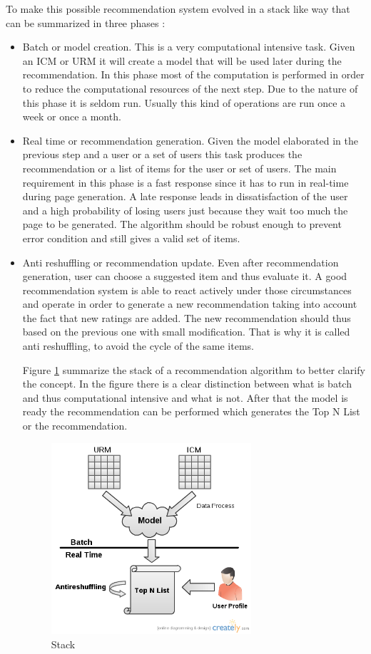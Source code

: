 To make this possible recommendation system evolved in a stack like way that can be summarized in three phases \cite{sys-rec-matlab}:
\begin{itemize}
\item Batch or model creation. This is a very computational intensive task. Given an ICM or URM it will create a model that will be used later during the recommendation. In this phase most of the computation is performed in order to reduce the computational resources of the next step. Due to the nature of this phase it is seldom run. Usually this kind of operations are run once a week or once a month.
\item Real time or recommendation generation. Given the model elaborated in the previous step and a user or a set of users this task produces the recommendation or a list of items for the user or set of users. The main requirement in this phase is a fast response since it has to run in real-time during page generation. A late response leads in dissatisfaction of the user and a high probability of losing users just because they wait too much the page to be generated. The algorithm should be robust enough to prevent error condition and still gives a valid set of items. 
\item Anti reshuffling or recommendation update. Even after recommendation generation, user can choose a suggested item and thus evaluate it. A good recommendation system is able to react actively under those circumstances and operate in order to generate a new recommendation taking into account the fact that new ratings are added. The new recommendation should thus based on the previous one with small modification. That is why it is called anti reshuffling, to avoid the cycle of the same items.

Figure \ref{fig:Stack} summarize the stack of a recommendation algorithm to better clarify the concept. In the figure there is a clear distinction between what is batch and thus computational intensive and what is not. After that the model is ready the recommendation can be performed which generates the Top N List or the recommendation. 
  \begin{figure}
    \centering
    \includegraphics[width=0.7\textwidth]{figures/stack.png}
    \caption{Stack}
    \label{fig:Stack}
  \end{figure}
\end{itemize}

